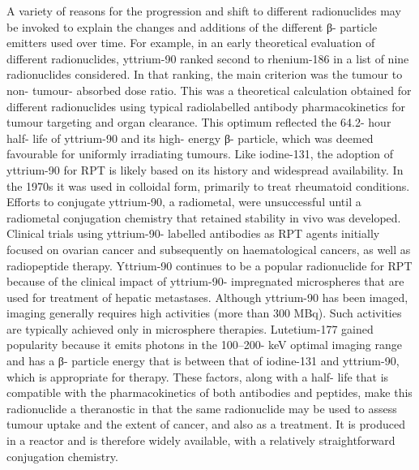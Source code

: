 \documentclass[
]{article}
\begin{document}
A variety of reasons for the progression and shift to different
radionuclides may be invoked to explain the changes and additions of the
different β- particle emitters used over time. For example, in an early
theoretical evaluation of different radionuclides, yttrium-90 ranked
second to rhenium-186 in a list of nine radionuclides considered. In
that ranking, the main criterion was the tumour to non- tumour- absorbed
dose ratio. This was a theoretical calculation obtained for different
radionuclides using typical radiolabelled antibody pharmacokinetics for
tumour targeting and organ clearance. This optimum reflected the 64.2-
hour half- life of yttrium-90 and its high- energy β- particle, which
was deemed favourable for uniformly irradiating tumours. Like
iodine-131, the adoption of yttrium-90 for RPT is likely based on its
history and widespread availability. In the 1970s it was used in
colloidal form, primarily to treat rheumatoid conditions. Efforts to
conjugate yttrium-90, a radiometal, were unsuccessful until a radiometal
conjugation chemistry that retained stability in vivo was developed.
Clinical trials using yttrium-90- labelled antibodies as RPT agents
initially focused on ovarian cancer and subsequently on haematological
cancers, as well as radiopeptide therapy. Yttrium-90 continues to be a
popular radionuclide for RPT because of the clinical impact of
yttrium-90- impregnated microspheres that are used for treatment of
hepatic metastases. Although yttrium-90 has been imaged, imaging
generally requires high activities (more than 300 MBq). Such activities
are typically achieved only in microsphere therapies. Lutetium-177
gained popularity because it emits photons in the 100--200- keV optimal
imaging range and has a β- particle energy that is between that of
iodine-131 and yttrium-90, which is appropriate for therapy. These
factors, along with a half- life that is compatible with the
pharmacokinetics of both antibodies and peptides, make this radionuclide
a theranostic in that the same radionuclide may be used to assess tumour
uptake and the extent of cancer, and also as a treatment. It is produced
in a reactor and is therefore widely available, with a relatively
straightforward conjugation chemistry.
\end{document}
